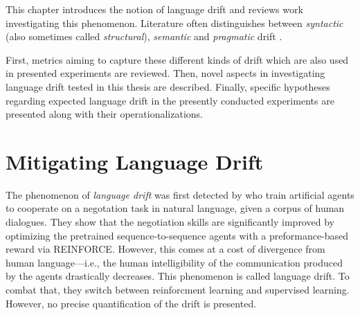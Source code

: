 This chapter introduces the notion of language drift and reviews work investigating this phenomenon. Literature often distinguishes between \textit{syntactic} (also sometimes called \textit{structural}), \textit{semantic} and \textit{pragmatic} drift \parencite{lazaridou2020multi}. 

First, metrics aiming to capture these different kinds of drift which are also used in presented experiments are reviewed. Then, novel aspects in investigating language drift tested in this thesis are described. Finally, specific hypotheses regarding expected language drift in the presently conducted experiments are presented along with their operationalizations. 

\section{Mitigating Language Drift}

The phenomenon of \textit{language drift} was first detected by \cite{lewis2017deal} who train artificial agents to cooperate on a negotation task in natural language, given a corpus of human dialogues. They show that the negotiation skills are significantly improved by optimizing the pretrained sequence-to-sequence agents with a preformance-based reward via REINFORCE. However, this comes at a cost of divergence from human language---i.e., the human intelligibility of the communication produced by the agents drastically decreases. This phenomenon is called language drift. To combat that, they switch between reinforcment learning and supervised learning. However, no precise quantification of the drift is presented. 

